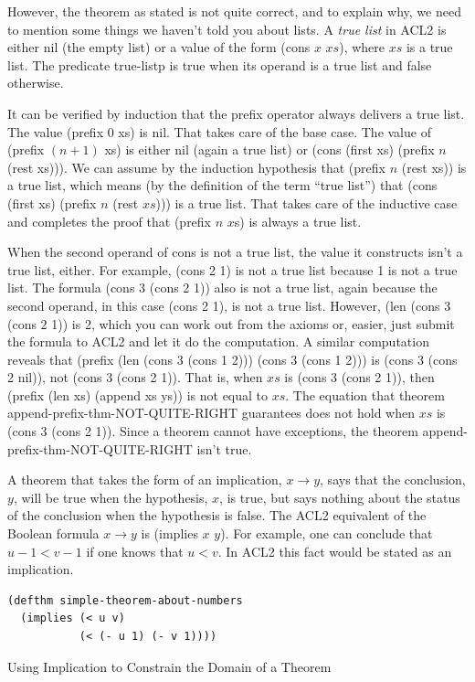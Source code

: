 However, the theorem as stated
is not quite correct,
and to explain why, we need to mention
some things we haven't told you about lists.
\label{true-list-def}A
\emph{true list} in ACL2 is either \textsf{nil} (the empty list)
or a value of the form \textsf{(cons $x$ $xs$)},
where $xs$ is a true list.
The predicate
\textsf{true-listp}
is true when its operand
is a true list and false otherwise.

It can be verified by induction that
the prefix operator always delivers a true list.
The value (prefix 0 xs) is \textsf{nil}.
That takes care of the base case.
The value of \textsf{(prefix $(n+1)$ xs)} is either \textsf{nil}
(again a true list)
or \textsf{(cons (first xs) (prefix $n$ (rest xs)))}.
We can assume by the induction hypothesis that
\textsf{(prefix $n$ (rest xs))} is a true list,
which means (by the definition of the term ``true list'')
that \textsf{(cons (first xs) (prefix $n$ (rest $xs$)))} is a true list.
That takes care of the inductive case and completes the proof
that \textsf{(prefix $n$ $x$s)} is always a true list.

When the second operand of cons is not a true list,
the value it constructs isn't a true list, either.
For example, (cons 2 1) is not a true list because 1 is not a true list.
The formula (cons 3 (cons 2 1)) also is not a true list,
again because the second operand,
in this case (cons 2 1), is not a true list.
However, (len (cons 3 (cons 2 1)) is 2, which you can work
out from the axioms or, easier,
just submit the formula to ACL2 and let it do the computation.
A similar computation reveals that
(prefix (len (cons 3 (cons 1 2))) (cons 3 (cons 1 2)))
is (cons 3 (cons 2 nil)), not (cons 3 (cons 2 1)).
That is, when $xs$ is (cons 3 (cons 2 1)),
then (prefix (len xs) (append xs ys)) is not equal to $xs$.
The equation that theorem append-prefix-thm-NOT-QUITE-RIGHT
guarantees does not hold when $xs$ is (cons 3 (cons 2 1)).
Since a theorem cannot have exceptions,
the theorem append-prefix-thm-NOT-QUITE-RIGHT
isn't true.

\begin{aside}
A theorem that takes the form of an implication, $x \rightarrow y$,
says that the conclusion, $y$, will be true when the hypothesis, $x$,
is true, but says nothing about the status of the conclusion when
the hypothesis is false. The ACL2 equivalent of the Boolean formula $x \rightarrow y$
is (implies $x$ $y$).
For example, one can conclude that $u - 1 < v - 1$
if one knows that $u < v$.
In ACL2 this fact would be stated as an implication.
\begin{Verbatim}
(defthm simple-theorem-about-numbers
  (implies (< u v)
           (< (- u 1) (- v 1))))
\end{Verbatim}
\caption{Using Implication to Constrain the Domain of a Theorem}
\label{thm-with-implies}
\end{aside}

